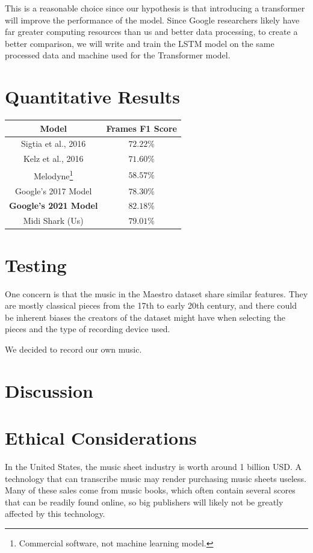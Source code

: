\documentclass[a4paper,twocolumn,10pt]{article}
\begin{document}
This is a reasonable choice since our hypothesis is that introducing a transformer will improve the performance of the model. Since Google researchers likely have far greater computing resources than us and better data processing, to create a better comparison, we will write and train the LSTM model on the same processed data and machine used for the Transformer model.  



\section{Quantitative Results}



\begin{center}
    \begin{tabular}{|c|c|}
        \hline
        Model& Frames F1 Score \\
        \hline
        Sigtia et al., 2016 & \(72.22\%\)\\
        \hline
        Kelz et al., 2016 & \(71.60\%\)\\
        \hline
        Melodyne\footnote{Commercial software, not machine learning model.} & \(58.57\%\)\\
        \hline
        Google’s 2017 Model & \(78.30\%\)\\
        \hline
        \textbf{Google’s 2021 Model} & \(\mathbf{82.18\%}\)\\
        \hline
        Midi Shark (Us) & \(79.01\%\)\\
        \hline
    \end{tabular}
\end{center}

\section{Testing}
One concern is that the music in the Maestro dataset share similar features. They are mostly classical pieces from the 17th to early 20th century\cite{maestro}, and there could be inherent biases the creators of the dataset might have when selecting the pieces and the type of recording device used.

We decided to record our own music.


\section{Discussion}
\section{Ethical Considerations}
In the United States, the music sheet industry is worth around 1 billion USD\cite{musicspoke}. A technology that can transcribe music may render purchasing music sheets useless. Many of these sales come from music books, which often contain several scores that can be readily found online, so big publishers will likely not be greatly affected by this technology.
\end{document}
